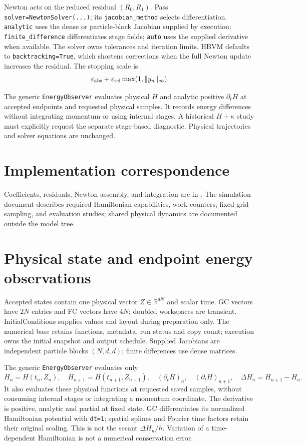 \documentclass[11pt,a4paper]{article}
\begin{document}
Newton acts on the reduced residual $(R_0,R_1)$. Pass
\texttt{solver=NewtonSolver(...)}; its \texttt{jacobian\_method} selects
differentiation. \texttt{analytic} uses the dense or particle-block Jacobian supplied by execution;
\texttt{finite\_difference} differentiates stage fields; \texttt{auto} uses the
supplied derivative when available. The solver owns tolerances and iteration
limits. HBVM defaults to \texttt{backtracking=True}, which shortens corrections
when the full Newton update increases the residual. The stopping scale is
\[
\varepsilon_{\rm abs}+\varepsilon_{\rm rel}
\max(1,\lVert y_n\rVert_\infty).
\]

The generic \texttt{EnergyObserver} evaluates physical $H$ and analytic
positive $\partial_t H$ at accepted endpoints and requested physical samples.
It records energy differences without integrating momentum or using internal
stages. A historical $H+\kappa$ study must explicitly request the separate
stage-based diagnostic. Physical trajectories and solver equations are unchanged.


\section{Implementation correspondence}

Coefficients, residuals, Newton assembly, and integration are in
.  The simulation document describes
required Hamiltonian capabilities, work counters, fixed-grid sampling, and
evaluation studies; shared physical dynamics are documented outside the model
tree.

\section{Physical state and endpoint energy observations}
Accepted states contain one physical vector $Z\in\mathbb{R}^{dN}$ and scalar time.
GC vectors have $2N$ entries and FC vectors have $4N$; doubled workspaces are
transient. InitialConditions supplies values and layout during preparation only.
The numerical base retains functions, metadata, run status and copy count;
execution owns the initial snapshot and output schedule. Supplied Jacobians are
independent particle blocks $(N,d,d)$; finite differences use dense matrices.

The generic \texttt{EnergyObserver} evaluates only
\[
 H_n=H(t_n,Z_n),\quad H_{n+1}=H(t_{n+1},Z_{n+1}),\quad
 (\partial_tH)_n,\quad (\partial_tH)_{n+1},\quad
 \Delta H_n=H_{n+1}-H_n.
\]
It also evaluates these physical functions at requested saved samples, without
consuming internal stages or integrating a momentum coordinate. The derivative
is positive, analytic and partial at fixed state. GC differentiates its normalized
Hamiltonian potential with \texttt{dt=1}; spatial splines and Fourier time factors
retain their original scaling. This is not the secant $\Delta H_n/h$.
Variation of a time-dependent Hamiltonian is not a numerical conservation error.
\end{document}
